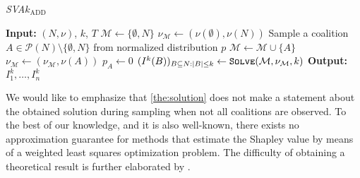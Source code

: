 \begin{algorithm}[ht]
    \caption{\emph{SVA}$k_{\text{ADD}}$}
    \label{alg:proposal}
		\begin{algorithmic}[1]
			\STATE \textbf{Input:} $(N,\nu)$, $k$, $T$		
            \STATE $\mathcal{M} \leftarrow \{\emptyset, N\}$
            \STATE $\nu_{\mathcal{M}} \leftarrow (\nu(\emptyset), \nu(N))$
                \STATE Sample a coalition $A \in \mathcal{P}(N) \setminus \{\emptyset, N\}$ from normalized distribution $p$
                \STATE $\mathcal{M} \leftarrow \mathcal{M} \cup \{A\}$
                \STATE $\nu_{\mathcal{M}} \leftarrow (\nu_{\mathcal{M}},\nu(A))$
                \STATE $p_A \leftarrow 0$
            \ENDWHILE
            \STATE $(I^k(B))_{B \subseteq N : |B| \leq k} \leftarrow \textsc{\texttt{Solve}}(\mathcal{M},\nu_{\mathcal{M}},k)$ 
            \STATE \textbf{Output:} $I_1^k,\ldots,I_n^k$
    \end{algorithmic}
\end{algorithm}

We would like to emphasize that \cref{the:solution} does not make a statement about the obtained solution during sampling when not all coalitions are observed.
To the best of our knowledge, and it is also well-known, there exists no approximation guarantee for methods that estimate the Shapley value by means of a weighted least squares optimization problem.
The difficulty of obtaining a theoretical result is further elaborated by \cite{Covert.2021}.